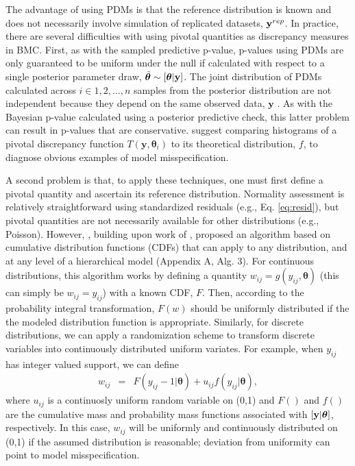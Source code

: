 \documentclass[12pt,english]{article}
\begin{document}
\begin{spacing}{1.9}
The advantage of using PDMs is that the reference distribution is
known and does not necessarily involve simulation of replicated
datasets, ${\bf y}^{rep}$.  In practice, there are several
difficulties with using pivotal quantities as discrepancy measures in
BMC.  First, as with the sampled predictive
p-value, p-values using PDMs are only guaranteed to be uniform under
the null if calculated with respect to a single posterior parameter
draw, $\tilde{\boldsymbol{\theta}} \sim [\boldsymbol{\theta} | {\bf y}]$.  The joint
distribution of PDMs calculated across $i \in 1,2,\hdots,n$ samples
from the posterior distribution are not independent because they
depend on the same observed data, $\textbf{y}$ \citep{Johnson2004}.
As with the Bayesian p-value calculated using a posterior predictive
check, this latter problem can result in p-values that are
conservative.  \citet{YuanJohnson2012} suggest comparing histograms of
a pivotal discrepancy function $T(\textbf{y},\boldsymbol{\theta}_i)$
to its theoretical distribution, $f$, to diagnose obvious examples of
model misspecification.

A second problem is that, to apply these techniques, one must first
define a pivotal quantity and ascertain its reference
distribution. Normality assessment is relatively straightforward using
standardized residuals (e.g., Eq. \ref{eq:resid}), but pivotal
quantities are not necessarily available for other distributions
(e.g., Poisson).  However, \citet{YuanJohnson2012}, building upon work
of \citet{Johnson2004}, proposed an algorithm based on cumulative
distribution functions (CDFs) that can apply to any distribution, and
at any level of a hierarchical model (Appendix A, Alg. 3).  For
continuous distributions, this algorithm works by defining a quantity
$w_{ij} = g(y_{ij},\boldsymbol{\theta})$ (this can simply be
$w_{ij}=y_{ij}$) with a known CDF, $F$.  Then, according to the
probability integral transformation, $F(w)$ should be uniformly
distributed if the the modeled distribution function is appropriate.
Similarly, for discrete distributions, we can apply a randomization
scheme \citep{Smith1985,YuanJohnson2012} to transform discrete
variables into continuously distributed uniform variates.  For
example, when $y_{ij}$ has integer valued support, we can define
\begin{eqnarray*}
  w_{ij} & = & F(y_{ij}-1|\boldsymbol{\theta}) + u_{ij} f(y_{ij}|\boldsymbol{\theta}),
\end{eqnarray*}
where $u_{ij}$ is a continuosly uniform random variable on (0,1) and
$F()$ and $f()$ are the cumulative mass and probability mass functions
associated with $[{\bf y} | \boldsymbol{\theta}]$, respectively.  In
this case, $w_{ij}$ will be uniformly and continuously distributed on
(0,1) if the assumed distribution is reasonable; deviation from
uniformity can point to model misspecification.


\end{spacing}
\end{document}
